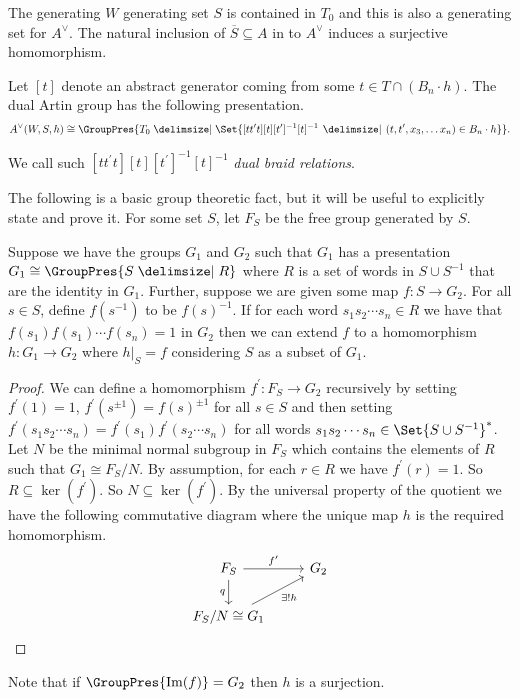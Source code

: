 \begin{theorem}
	The generating $W$ generating set $S$ is contained in $T_0$ and this is also a generating set for $A^\vee$.
	The natural inclusion of $\overline{S} \subseteq A$ in to $A^\vee$ induces a surjective homomorphism.
	\label{thm:homo_art_to_dual_art}
\end{theorem}

\begin{theorem}
	Let $[t]$ denote an abstract generator coming from some $t \in T \cap(B_n \cdot h)$.
	The dual Artin group has the following presentation.
	\[
		A^\vee(W,S,h) \cong \GroupPres{T_0 \relations \Set{ [t t^\prime t][t][t^\prime]^{-1}[t]^{-1} \given (t,t^\prime,x_3, \ldots x_n) \in B_n \cdot h}}
		.\]
	\label{thm:dual_braid_relations}
\end{theorem}

We call such $[t t^\prime t][t][t^\prime]^{-1}[t]^{-1}$ \emph{dual braid relations}.

The following is a basic group theoretic fact, but it will be useful to explicitly state and prove it.
For some set $S$, let $F_S$ be the free group generated by $S$.
\begin{lemma}
	Suppose we have the groups $G_1$ and $G_2$ such that $G_1$ has a presentation $G_1 \cong \GroupPres{S \relations R}$ where $R$ is a set of words in $S \cup S^{-1}$ that are the identity in $G_1$.
	Further, suppose we are given some map $f \colon S \to G_2$.
	For all $s \in S$, define $f(s^{-1})$ to be $f(s)^{-1}$.
	If for each word $s_1s_2 \cdots s_n \in R$ we have that $f(s_1)f(s_1)\cdots f(s_n) = 1$ in $G_2$ then we can extend $f$ to a homomorphism  $h \colon G_1 \to G_2$ where $h|_{S} = f$ considering $S$ as a subset of $G_1$.
	\label{lem:extend_map_to_homomorphism}
\end{lemma}
\begin{proof}
	We can define a homomorphism $f^\prime \colon F_{S} \to G_2$ recursively by setting $f^\prime(1) =1$, $f^\prime(s^{\pm 1}) = f(s)^{\pm 1}$ for all $s \in S$ and then setting $f^\prime(s_1s_2 \cdots s_n) = f^\prime(s_1)f^\prime(s_2\cdots s_n)$ for all words $s_1s_2\cdots s_n \in \Set{S \cup S^{-1}}^*$.
	Let $N$ be the minimal normal subgroup in $F_{S}$ which contains the elements of $R$ such that $G_1 \cong F_{S}/N$.
	By assumption, for each $r \in R$ we have $f^\prime(r) = 1$.
	So $R \subseteq \ker(f^\prime)$.
	So $N \subseteq \ker(f^\prime)$.
	By the universal property of the quotient we have the following commutative diagram where the unique map $h$ is the required homomorphism.
	\begin{equation*}
		\begin{tikzcd}
			F_{S} \ar[r, "f^\prime"] \ar[d, "q"'] &G_2 \\
			F_{S}/N \cong G_1 \ar[ru, "\exists ! h"']
		\end{tikzcd}
	\end{equation*}
\end{proof}
Note that if $\GroupPres{\image(f)} = G_2$ then $h$ is a surjection.


